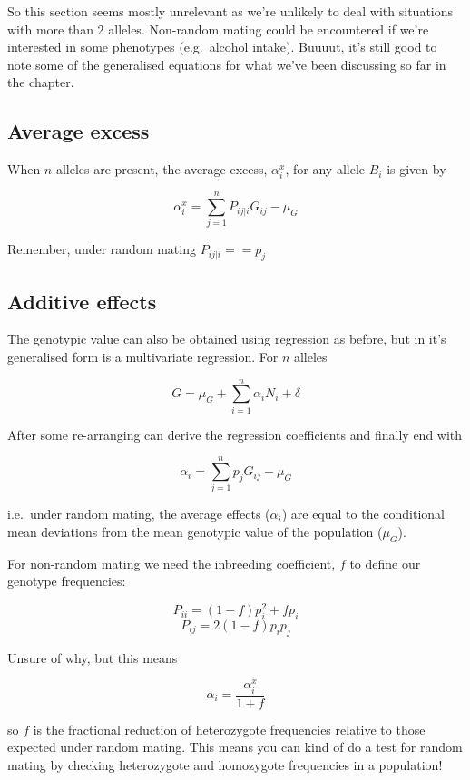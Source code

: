 \documentclass[
]{book}
\begin{document}
So this section seems mostly unrelevant as we're unlikely to deal with situations with more than 2 alleles. Non-random mating could be encountered if we're interested in some phenotypes (e.g.~alcohol intake). Buuuut, it's still good to note some of the generalised equations for what we've been discussing so far in the chapter.

\hypertarget{average-excess}{%
\subsection{Average excess}\label{average-excess}}

When \(n\) alleles are present, the average excess, \(\alpha^x_i\), for any allele \(B_i\) is given by

\[ \alpha^x_i = \sum_{j=1}^{n} P_{ij|i}G_{ij} - \mu_G \]

Remember, under random mating \(P_{ij|i} == p_j\)

\hypertarget{additive-effects}{%
\subsection{Additive effects}\label{additive-effects}}

The genotypic value can also be obtained using regression as before, but in it's generalised form is a multivariate regression. For \(n\) alleles

\[ G = \mu_G + \sum_{i=1}^{n} \alpha_{i}N_{i} + \delta \]

After some re-arranging can derive the regression coefficients and finally end with

\[ \alpha_i = \sum_{j=1}^{n} p_jG_{ij} - \mu_G \]

i.e.~under random mating, the average effects (\(\alpha_i\)) are equal to the conditional mean deviations from the mean genotypic value of the population (\(\mu_G\)).

For non-random mating we need the inbreeding coefficient, \(f\) to define our genotype frequencies:

\[ P_{ii} = (1 - f)p^2_i + fp_i \]
\[ P_{ij} = 2(1 -f)p_ip_j \]

Unsure of why, but this means

\[ \alpha_i = \frac{\alpha^x_i} {1 + f} \]

so \(f\) is the fractional reduction of heterozygote frequencies relative to those expected under random mating. This means you can kind of do a test for random mating by checking heterozygote and homozygote frequencies in a population!
\end{document}
